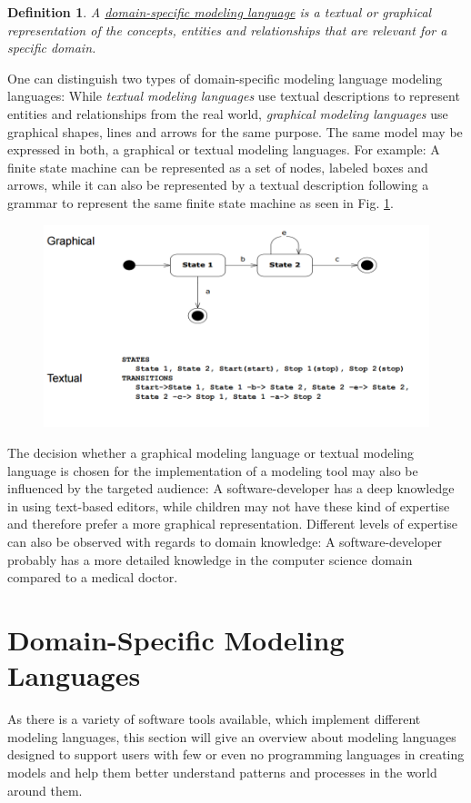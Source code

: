 \documentclass[runningheads,a4paper]{llncs}
\newtheorem{defn}{Definition}
\begin{document}
\begin{defn}
\label{def:domain}
A \underline{domain-specific modeling language} is a textual or graphical representation of the concepts, entities and relationships that are 
relevant for a specific domain.
\end{defn}
One can distinguish two types of domain-specific modeling language modeling languages:
While \emph{textual modeling languages} use textual descriptions to represent entities and relationships from the real world,
\emph{graphical modeling languages} use graphical shapes, lines and arrows for the same purpose.
The same model may be expressed in both, a graphical or textual modeling languages.
For example: A finite state machine can be represented as a set of nodes, labeled boxes and arrows, while it can also be 
represented by a textual description following a grammar to represent the same finite state machine as seen in Fig. \ref{compare:textgraphiclang}.
\begin{figure}[H]
      \centering
      \includegraphics[width=.8\textwidth]{images/GraficalTextualComparison.PNG}
      \label{compare:textgraphiclang}
\end{figure}
The decision whether a graphical modeling language or textual modeling language is chosen for the implementation of a modeling tool 
may also be influenced by the targeted audience: A software-developer has a deep knowledge in using text-based editors, while 
children may not have these kind of expertise and therefore prefer a more graphical representation. 
Different levels of expertise can also be observed with regards to domain knowledge:
A software-developer probably has a more detailed knowledge in the computer science domain compared to a medical doctor.


 \section{Domain-Specific Modeling Languages}
 \label{section:dsml}
 As there is a variety of software tools available, which implement different modeling languages, this section will give an overview 
 about modeling languages designed to support users with few or even no programming languages in creating models and help them better 
 understand patterns and processes in the world around them.
 
\end{document}
